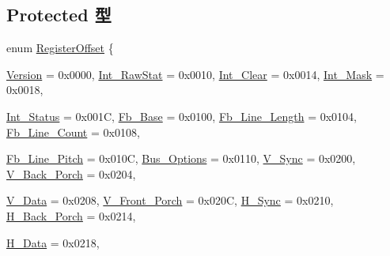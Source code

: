 \subsection*{Protected 型}
\begin{DoxyCompactItemize}
\item 
enum \hyperlink{classHDLcd_a5589603d1462868f128ddcda455b167a}{RegisterOffset} \{ \par
\hyperlink{classHDLcd_a5589603d1462868f128ddcda455b167aaaecf3eedf8cb9291bcba326089c9508a}{Version} =  0x0000, 
\hyperlink{classHDLcd_a5589603d1462868f128ddcda455b167aa1be27d857bb87a9ae6813b06cdcbab49}{Int\_\-RawStat} =  0x0010, 
\hyperlink{classHDLcd_a5589603d1462868f128ddcda455b167aafcaf90f877eec92e9d06f667da4ef93a}{Int\_\-Clear} =  0x0014, 
\hyperlink{classHDLcd_a5589603d1462868f128ddcda455b167aa41681a9749cd3e11f4e1a1981dda1c7f}{Int\_\-Mask} =  0x0018, 
\par
\hyperlink{classHDLcd_a5589603d1462868f128ddcda455b167aa0d141ad1f9a40ed4a7f80aed471dde27}{Int\_\-Status} =  0x001C, 
\hyperlink{classHDLcd_a5589603d1462868f128ddcda455b167aae73e315a15940c9ec92665d532b0ec3f}{Fb\_\-Base} =  0x0100, 
\hyperlink{classHDLcd_a5589603d1462868f128ddcda455b167aa4bb8d9aadacffc879da4c56a479deb50}{Fb\_\-Line\_\-Length} =  0x0104, 
\hyperlink{classHDLcd_a5589603d1462868f128ddcda455b167aab622dfd78db0239caba70c2465460563}{Fb\_\-Line\_\-Count} =  0x0108, 
\par
\hyperlink{classHDLcd_a5589603d1462868f128ddcda455b167aa1a1fed2414dcc0ebf810a266630dc615}{Fb\_\-Line\_\-Pitch} =  0x010C, 
\hyperlink{classHDLcd_a5589603d1462868f128ddcda455b167aa8ecde41db7d43d0f947af7a4990cadd8}{Bus\_\-Options} =  0x0110, 
\hyperlink{classHDLcd_a5589603d1462868f128ddcda455b167aa388f28a3d8b85e71937474d347f4e24d}{V\_\-Sync} =  0x0200, 
\hyperlink{classHDLcd_a5589603d1462868f128ddcda455b167aaf788d81eab9ff4992ff5550983392df7}{V\_\-Back\_\-Porch} =  0x0204, 
\par
\hyperlink{classHDLcd_a5589603d1462868f128ddcda455b167aa068573e257c781b4e4eb0af5fb26178e}{V\_\-Data} =  0x0208, 
\hyperlink{classHDLcd_a5589603d1462868f128ddcda455b167aa69c77a38764fbc5b5567f13b5eb4267b}{V\_\-Front\_\-Porch} =  0x020C, 
\hyperlink{classHDLcd_a5589603d1462868f128ddcda455b167aafad2bb41d868c428adc9f68b275fb34a}{H\_\-Sync} =  0x0210, 
\hyperlink{classHDLcd_a5589603d1462868f128ddcda455b167aa22ed0ca08a37a1c7a4a6266a3e90363f}{H\_\-Back\_\-Porch} =  0x0214, 
\par
\hyperlink{classHDLcd_a5589603d1462868f128ddcda455b167aafdec0d05c0c1116a7462d36544894da5}{H\_\-Data} =  0x0218, 

\end{DoxyCompactItemize}
